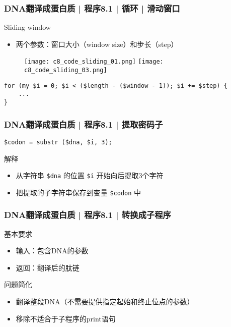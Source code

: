 \begin{frame}[fragile]
  \frametitle{DNA翻译成蛋白质 | 程序8.1 | 循环 | 滑动窗口}
  \begin{block}{Sliding window}
    \begin{itemize}
      \item 两个参数：窗口大小（window size）和步长（step）
    \end{itemize}
    \vspace{-0.8em}
    \begin{figure}
      \centering
      \texttt{[image: c8\_code\_sliding\_01.png]}
      \texttt{[image: c8\_code\_sliding\_03.png]}
    \end{figure}
  \end{block}
  \pause
\begin{lstlisting}
for (my $i = 0; $i < ($length - ($window - 1)); $i += $step) {
    ...
}
\end{lstlisting}
\end{frame}

\begin{frame}[fragile]
  \frametitle{DNA翻译成蛋白质 | 程序8.1 | \alert{提取密码子}}
\begin{lstlisting}
$codon = substr ($dna, $i, 3);
\end{lstlisting}
\pause
\begin{block}{解释}
  \begin{itemize}
    \item 从字符串 \verb|$dna| 的位置 \verb|$i| 开始向后提取3个字符
    \item 把提取的子字符串保存到变量 \verb|$codon| 中
  \end{itemize}
\end{block}
\end{frame}

\begin{frame}
  \frametitle{DNA翻译成蛋白质 | 程序8.1 | 转换成子程序}
  \begin{block}{基本要求}
  \begin{itemize}
    \item 输入：包含DNA的参数
    \item 返回：翻译后的肽链
  \end{itemize}
  \end{block}
  \pause
  \begin{block}{问题简化}
    \begin{itemize}
      \item 翻译整段DNA（不需要提供指定起始和终止位点的参数）
      \item 移除不适合于子程序的print语句
    \end{itemize}
  \end{block}
\end{frame}

